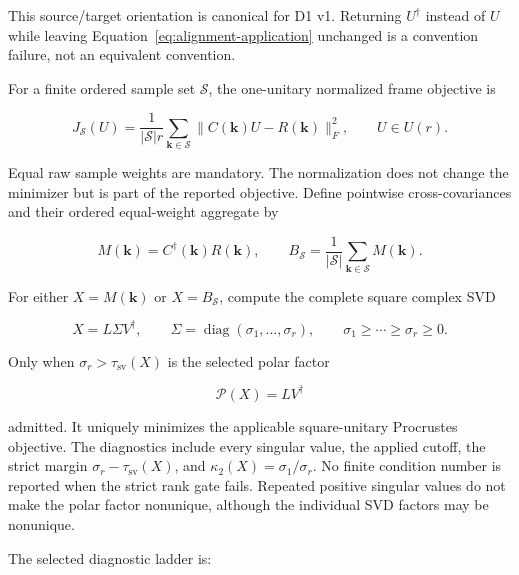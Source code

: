 \documentclass[11pt]{article}
\begin{document}
This source/target orientation is canonical for D1 v1. Returning $U^\dagger$ instead of
$U$ while leaving Equation~\eqref{eq:alignment-application} unchanged is a convention
failure, not an equivalent convention.

For a finite ordered sample set $\mathcal S$, the one-unitary normalized frame objective
is

\begin{equation}
 J_{\mathcal S}(U)
 =\frac{1}{|\mathcal S|r}
 \sum_{\mathbf k\in\mathcal S}
 \lVert C(\mathbf k)U-R(\mathbf k)\rVert_F^2,
 \qquad U\in U(r).
 \label{eq:alignment-global-objective}
\end{equation}

Equal raw sample weights are mandatory. The normalization does not change the minimizer
but is part of the reported objective. Define pointwise cross-covariances and their
ordered equal-weight aggregate by

\begin{equation}
 M(\mathbf k)=C^\dagger(\mathbf k)R(\mathbf k),
 \qquad
 B_{\mathcal S}=\frac{1}{|\mathcal S|}
 \sum_{\mathbf k\in\mathcal S}M(\mathbf k).
 \label{eq:alignment-cross-covariances}
\end{equation}

For either $X=M(\mathbf k)$ or $X=B_{\mathcal S}$, compute the complete square complex
SVD

\begin{equation}
 X=L\Sigma V^\dagger,
 \qquad
 \Sigma=\operatorname{diag}(\sigma_1,\ldots,\sigma_r),
 \qquad
 \sigma_1\geq\cdots\geq\sigma_r\geq0.
 \label{eq:alignment-svd}
\end{equation}

Only when $\sigma_r>\tau_{\mathrm{sv}}(X)$ is the selected polar factor

\begin{equation}
 \mathcal P(X)=LV^\dagger
 \label{eq:alignment-polar-factor}
\end{equation}

admitted. It uniquely minimizes the applicable square-unitary Procrustes objective. The
diagnostics include every singular value, the applied cutoff, the strict margin
$\sigma_r-\tau_{\mathrm{sv}}(X)$, and
$\kappa_2(X)=\sigma_1/\sigma_r$. No finite condition number is reported when the strict
rank gate fails. Repeated positive singular values do not make the polar factor
nonunique, although the individual SVD factors may be nonunique.

The selected diagnostic ladder is:
\end{document}
